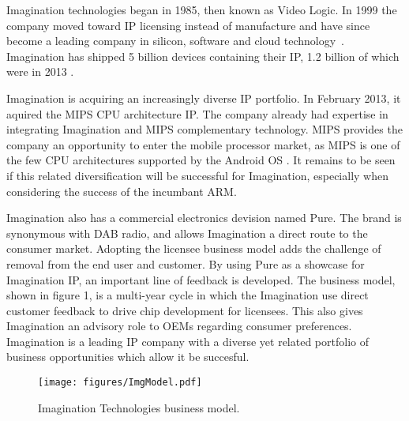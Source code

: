 
Imagination technologies began in 1985, then known as Video Logic.
In 1999 the company moved toward IP licensing instead of manufacture and have since become a leading company in silicon, software and cloud technology~\cite{ImgHist}. Imagination has shipped 5 billion devices containing their IP, 1.2 billion of which were in 2013 \cite{ImgAnn13}.

Imagination is acquiring an increasingly diverse IP portfolio. In February 2013, it aquired the MIPS CPU architecture IP.
The company already had expertise in integrating Imagination and MIPS complementary technology.
MIPS provides the company an opportunity to enter the mobile processor market, as MIPS is one of the few CPU architectures supported by the Android OS \cite{ImgAnn13}. 
It remains to be seen if this related diversification will be successful for Imagination, especially when considering the success of the incumbant ARM.


Imagination also has a commercial electronics devision named Pure. 
The brand is synonymous with DAB radio, and allows Imagination a direct route to the consumer market.
Adopting the licensee business model adds the challenge of removal from the end user and customer.
By using Pure as a showcase for Imagination IP, an important line of feedback is developed.
The business model, shown in figure 1, is a multi-year cycle in which the Imagination use direct customer feedback to drive chip development for licensees.
This also gives Imagination an advisory role to OEMs regarding consumer preferences.
Imagination is a leading IP company with a diverse yet related portfolio of business opportunities which allow it be succesful.
 
\begin{figure}[!htb]
   \centering
   \texttt{[image: figures/ImgModel.pdf]}
   \label{figure:ImgModel}
   \caption{Imagination Technologies business model.}
\end{figure}
